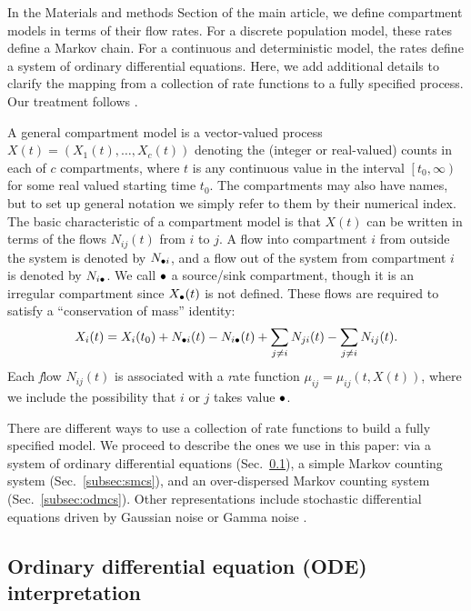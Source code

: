In the Materials and methods Section of the main article, we define compartment models in terms of their flow rates.
For a discrete population model, these rates define a Markov chain.
For a continuous and deterministic model, the rates define a system of ordinary differential equations.
Here, we add additional details to clarify the mapping from a collection of rate functions to a fully specified process.
Our treatment follows \cite{breto09}.

A general compartment model is a vector-valued process $X(t)=(X_1(t),\dots,X_c(t))$ denoting the (integer or real-valued) counts in each of $c$ compartments, where $t$ is any continuous value in the interval  $\left[t_0, \infty\right)$ for some real valued starting time $t_0$.
The compartments may also have names, but to set up general notation we simply refer to them by their numerical index.
The basic characteristic of a compartment model is that $X(t)$ can be written in terms of the flows $N_{ij}(t)$ from $i$ to $j$.
A flow into compartment $i$ from outside the system is denoted by $N_{\bullet i}$, and a flow out of the system from compartment $i$ is denoted by $N_{i\bullet}$.
We call $\bullet$ a source/sink compartment, though it is an irregular compartment since $X_{\bullet}(t)$ is not defined.
These flows are required to satisfy a ``conservation of mass'' identity:
\begin{equation}
X_i(t)=X_i(t_0)+N_{\bullet i}(t) - N_{i\bullet}(t) + \sum_{j\neq
i}N_{ji}(t)-\sum_{j\neq i}N_{ij}(t). \label{eq:conservation}
\end{equation}
Each {\emph flow} $N_{ij}(t)$ is associated with a {\emph rate} function
$\mu_{ij}=\mu_{ij}(t,X(t))$, where we include the possibility that $i$ or $j$ takes value $\bullet$.

There are different ways to use a collection of rate functions to build a fully specified model.
We proceed to describe the ones we use in this paper: via a system of ordinary differential equations (Sec.~\ref{subsec:ode}), a simple Markov counting system (Sec.~\ref{subsec:smcs}), and an over-dispersed Markov counting system (Sec.~\ref{subsec:odmcs}). Other representations include stochastic differential equations driven by Gaussian noise or Gamma noise \cite{bhadra11}.

\subsection{Ordinary differential equation (ODE) interpretation}
\label{subsec:ode}

